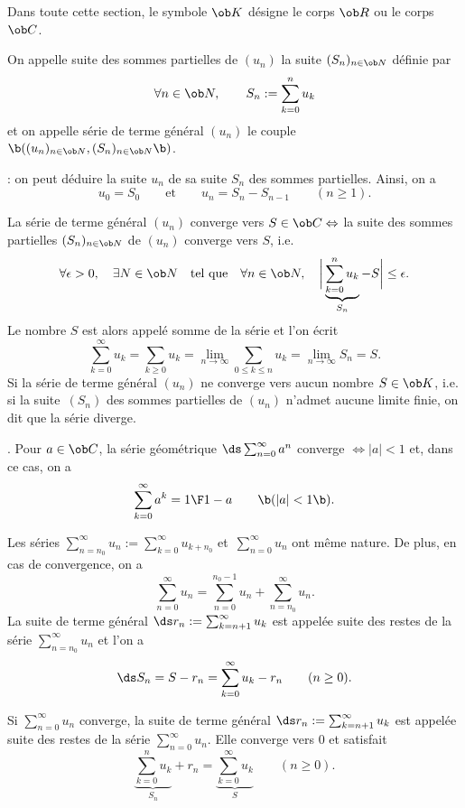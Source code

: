 Dans toute cette section, le symbole $\ob K$ d\'esigne le corps $\ob R$ ou le corps $\ob C$. 
\bigskip

On appelle suite des sommes partielles de $(u_n)$ la suite $(S_n)_{n\in\ob N}$ d\'efinie par 
$$
\forall n\in\ob N, \qquad S_n:=\sum_{k=0}^nu_k
$$ 
et on appelle s\'erie de terme g\'en\'eral $(u_n)$ le couple $\b((u_n)_{n\in\ob N},(S_n)_{n\in\ob N}\b)$. 
\bigskip

\Remarque : on peut d\'eduire la suite $u_n$ de sa suite $S_n$ des sommes partielles. Ainsi, on a 
$$
u_0=S_0\qquad \mbox{et}\qquad u_n=S_n-S_{n-1}\qquad(n\ge1). 
$$

La s\'erie de terme g\'en\'eral $(u_n)$ converge vers $S\in\ob C\Leftrightarrow$ 
la suite des sommes partielles $(S_n)_{n\in\ob N}$ de $(u_n)$ converge vers $S$, i.e. 
$$
\forall\epsilon>0,\quad \exists N\in\ob N\quad \mbox{tel que} \quad \forall n\in\ob N, \quad 
\bigg|\underbrace{\sum_{k=0}^nu_k}_{S_n}-S\bigg|\le\epsilon. 
$$
Le nombre $S$ est alors appel\'e somme de la s\'erie et l'on \'ecrit 
$$
\sum_{k=0}^\infty u_k=\sum_{k\ge0}u_k=\lim_{n\to\infty}\sum_{0\le k\le n}u_k=\lim_{n\to\infty}S_n=S. 
$$ 
Si la s\'erie de terme g\'en\'eral $(u_n)$ ne converge vers aucun nombre $S\in\ob K$, i.e. si la suite~$(S_n)$ des sommes partielles de $(u_n)$ n'admet aucune limite finie, 
on dit que la s\'erie diverge. 
\medskip

\Exemple. Pour $a\in\ob C$, la s\'erie g\'eom\'etrique $\ds\sum_{n=0}^\infty a^n$ converge $\Leftrightarrow|a|<1$ et, dans ce cas, on a 
$$
\sum_{k=0}^\infty a^k={1\F1-a}\qquad\b(|a|<1\b). 
$$

Les s\'eries $\sum_{n=n_0}^\infty u_n:=\sum_{k=0}^\infty u_{k+n_0}$ et~$\sum_{n=0}^\infty u_n$ ont m\^eme nature. 
De plus, en cas de convergence, on a 
$$
\sum_{n=0}^\infty u_n=\sum_{n=0}^{n_0-1}u_n+\sum_{n=n_0}^\infty u_n.
$$
La suite de terme g\'en\'eral $\ds r_n:=\sum_{k=n+1}^\infty u_k$ 
est appel\'ee suite des restes de la s\'erie $\sum_{n=n_0}^\infty u_n$ et l'on a 
$$
\ds S_n=S-r_n=\sum_{k=0}^\infty u_k-r_n\qquad(n\ge0).
$$ 

Si $\sum_{n=0}^\infty u_n$ converge, la suite de terme g\'en\'eral $\ds r_n:=\sum_{k=n+1}^\infty u_k$ 
est appel\'ee suite des restes de la s\'erie $\sum_{n=0}^\infty u_n$. Elle converge vers $0$ et satisfait 
$$
\underbrace{\sum_{k=0}^nu_k}_{S_n}+r_n=\underbrace{\sum_{k=0}^\infty u_k}_{S}\qquad(n\ge0).
$$ 


